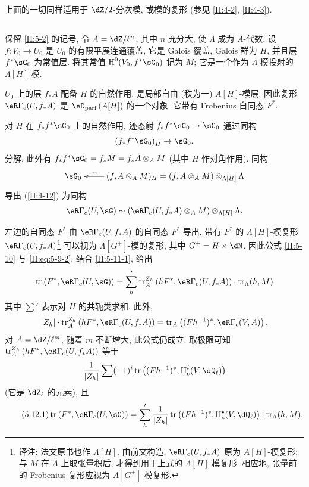 上面的一切同样适用于 $\dZ/2$-分次模, 或模的复形 (参见 \ref{II:4-2}, \ref{II:4-3}).

\subsection{}\label{II:5-12}

保留 \ref{II:5-2} 的记号, 令 $A=\dZ/\ell^n$, 其中 $n$ 充分大, 使 $\Lambda$ 成为 $A$-代数. 设 $f:V_0\to U_0$ 是 $U_0$ 的有限平展连通覆盖, 它是 Galois 覆盖, Galois 群为 $H$, 并且层 $f^*\sG_0$ 为常值层. 将其常值 $\h^0(V_0,f^*\sG_0)$ 记为 $M$; 它是一个作为 $\Lambda$-模投射的 $\Lambda[H]$-模.

$U_0$ 上的层 $f_* A$ 配备 $H$ 的自然作用, 是局部自由 (秩为一) $A[H]$-模层. 因此复形 $\eR\Gamma_c(U,f_* A)$ 是 $\eD_\text{parf}\left(A[H]\right)$ 的一个对象. 它带有 Frobenius 自同态 $F^*$.

对 $H$ 在 $f_* f^*\sG_0$ 上的自然作用, 迹态射 $f_* f^*\sG_0\to\sG_0$ 通过同构
\[
  \left(f_* f^*\sG_0\right)_H \to \sG_0 \text{.}
\]
分解. 此外有 $f_* f^*\sG_0=f_*M=f_* A\otimes_A M$
(其中 $H$ 作对角作用). 同构
\[\xymatrix{
  \sG_0
    & \ar[l]_-\sim (f_* A\otimes_A M)_H = (f_* A\otimes_A M)\otimes_{\Lambda[H]} \Lambda
}\]
导出 (\ref{II:4-12}) 为同构
\[
  \eR\Gamma_c(U,\sG) \sim \left(\eR\Gamma_c(U,f_* A)\otimes_A M\right)\otimes_{\Lambda[H]} \Lambda \text{.}
\]

左边的自同态 $F^*$ 由 $\eR\Gamma_c(U,f_* A)$ 的自同态 $F^*$ 导出. 带有 $F^*$ 的 $\Lambda[H]$-模复形 $\eR\Gamma_c(U,f_* A)$\footnote{译注: 法文原书也作 $\Lambda[H]$. 由前文构造, $\eR\Gamma_c(U,f_*A)$ 原为 $A[H]$-模复形; 与 $M$ 在 $A$ 上取张量积后, 才得到用于上式的 $\Lambda[H]$-模复形. 相应地, 张量前的 Frobenius 复形应视为 $A[G^+]$-模复形.} 可以视为 $\Lambda[G^+]$-模的复形, 其中 $G^+=H\times \dN$. 因此公式 \ref{II:5-10} 与 \eqref{II:eq:5-9-2}, 结合 \ref{II:5-11-1}, 给出
\[
  \tr\left(F^*,\eR\Gamma_c(U,\sG)\right) = \sum_h' \tr_A^{Z_h}\left(h F^*,\eR\Gamma_c(U,f_* A)\right)\cdot \tr_\Lambda(h,M)
\]
其中 $\sum'$ 表示对 $H$ 的共轭类求和. 此外,
\[
  |Z_h|\cdot \tr_A^{Z_h}\left(h F^*,\eR\Gamma_c(U,f_* A)\right) = \tr_A\left((F h^{-1})^*,\eR\Gamma_c(V,A)\right) \text{.}
\]
对 $A=\dZ/\ell^m$, 随着 $m$ 不断增大, 此公式仍成立. 取极限可知 $\tr_A^{Z_h}\left(h F^*,\eR\Gamma_c(U,f_* A)\right)$ 等于
\[
  \frac{1}{|Z_h|} \sum (-1)^i \tr\left((F h^{-1})^*,\h_c^i(V,\dQ_\ell)\right)
\]
(它是 $\dZ_\ell$ 的元素), 且
\begin{equation*}\tag{5.12.1}\label{II:eq:5-12-1}
\tr\left(F^*,\eR\Gamma_c(U,\sG)\right) = \sum_h' \frac{1}{|Z_h|} \tr\left((F h^{-1})^*,\h_c^\bullet(V,\dQ_\ell)\right)\cdot \tr_\Lambda(h,M) \text{.}
\end{equation*}

